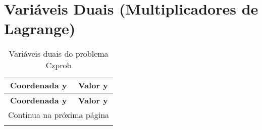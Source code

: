 \documentclass[12pt]{article}
\begin{document}
\section{Variáveis Duais (Multiplicadores de Lagrange)}

\begin{longtable}{@{}cc@{}}
\caption{Variáveis duais do problema Czprob} \\
\toprule
\textbf{Coordenada y} & \textbf{Valor y} \\
\midrule
\endfirsthead

\toprule
\textbf{Coordenada y} & \textbf{Valor y} \\
\midrule
\endhead

\midrule \multicolumn{2}{r}{{Continua na próxima página}} \\ \midrule
\endfoot


\end{longtable}
\end{document}

